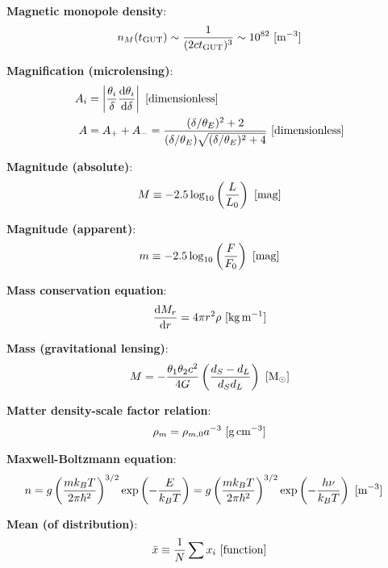 \documentclass[a4paper,10pt]{article}
\begin{document}
{\noindent}\textbf{Magnetic monopole density}:
\begin{align*}
    n_M(t_\mathrm{GUT}) \sim \frac{1}{(2ct_\mathrm{GUT})^3} \sim 10^{82} ~ [{\rm m^{-3}}]
\end{align*}

{\noindent}\textbf{Magnification (microlensing)}:
\begin{align*}
    A_i &= \left\lvert \frac{\theta_i}{\delta}\frac{{\rm d}\theta_i}{{\rm d}\delta} \right\rvert ~ [{\rm dimensionless}] \\
    A &= A_+ + A_- = \frac{(\delta/\theta_E)^2+2}{(\delta/\theta_E)\sqrt{(\delta/\theta_E)^2+4}} ~ [{\rm dimensionless}]
\end{align*}

{\noindent}\textbf{Magnitude (absolute)}:
\begin{align*}
    M \equiv -2.5\log_{10}\left(\frac{L}{L_0}\right) ~ [{\rm mag}]
\end{align*}

{\noindent}\textbf{Magnitude (apparent)}:
\begin{align*}
    m \equiv -2.5\log_{10}\left(\frac{F}{F_0}\right) ~ [{\rm mag}]
\end{align*}

{\noindent}\textbf{Mass conservation equation}:
\begin{align*}
    \frac{{\rm d}M_r}{{\rm d}r} = 4\pi r^2\rho ~ [{\rm kg\,m^{-1}}]
\end{align*}

{\noindent}\textbf{Mass (gravitational lensing)}:
\begin{align*}
    M = -\frac{\theta_1\theta_2c^2}{4G} \left(\frac{d_S-d_L}{d_Sd_L}\right) ~ [{\rm M_\odot}]
\end{align*}

{\noindent}\textbf{Matter density-scale factor relation}:
\begin{align*}
    \rho_m = \rho_{m,0}a^{-3} ~ [{\rm g\,cm^{-3}}]
\end{align*}

{\noindent}\textbf{Maxwell-Boltzmann equation}:
\begin{align*}
    n &= g\left(\frac{mk_BT}{2\pi\hbar^2}\right)^{3/2}\exp\left(-\frac{E}{k_BT}\right) = g\left(\frac{mk_BT}{2\pi\hbar^2}\right)^{3/2}\exp\left(-\frac{h\nu}{k_BT}\right) ~ [{\rm m^{-3}}]
\end{align*}

{\noindent}\textbf{Mean (of distribution)}:
\begin{align*}
    \bar{x} \equiv \frac{1}{N} \sum x_i ~ [{\rm function}]
\end{align*}
\end{document}
